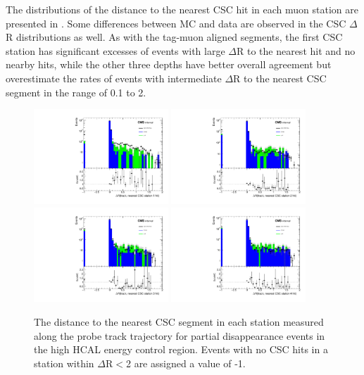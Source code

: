 The distributions of the distance to the nearest CSC hit in each muon station are presented in . 
Some differences between MC and data are observed in the CSC $\Delta$R distributions as well. 
As with the tag-muon aligned segments, the first CSC station has significant excesses of events with large $\Delta$R to the nearest hit and no nearby hits, while the other three depths have better overall agreement but overestimate the rates of events with intermediate $\Delta$R to the nearest CSC segment in the range of 0.1 to 2.

\begin{figure}[htbp]
	\label{fig:BDTcscvalid}
	\centering
	\includegraphics[width=0.45\textwidth]{figures/highHcal_cscDr_station0.pdf}
	\hspace{0.01\textwidth}
	\includegraphics[width=0.45\textwidth]{figures/highHcal_cscDr_station1.pdf}
	\vspace{0.01\textwidth}
	\includegraphics[width=0.45\textwidth]{figures/highHcal_cscDr_station2.pdf}
	\hspace{0.01\textwidth}
	\includegraphics[width=0.45\textwidth]{figures/highHcal_cscDr_station3.pdf} 
        \caption[CSC Segment Validation]{The distance to the nearest CSC segment in each station measured along the probe track trajectory for partial disappearance events in the high HCAL energy control region. Events with no CSC hits in a station within $\Delta$R$<$2 are assigned a value of -1.}
\end{figure}

